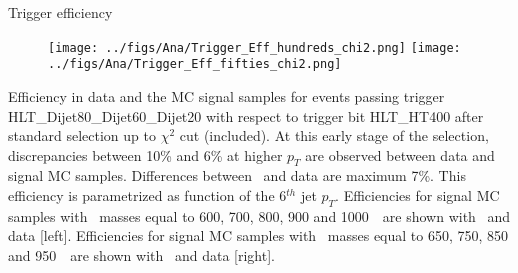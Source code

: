


\begin{frame}{Trigger efficiency}
\vspace{-.5cm}
\begin{figure}[!Hhtbp]
  \begin{center}
    \texttt{[image: ../figs/Ana/Trigger\_Eff\_hundreds\_chi2.png]}
    \texttt{[image: ../figs/Ana/Trigger\_Eff\_fifties\_chi2.png]}
  \end{center}
\end{figure}

\vspace{-.6cm}
    \begin{block}{}
      \tiny \centering Efficiency in data and the MC signal samples for events passing trigger HLT\_Dijet80\_Dijet60\_Dijet20 with respect to trigger bit HLT\_HT400 after standard selection up to $\chi^{2}$ cut (included). At this early stage of the selection, discrepancies between 10\% and 6\% at higher $p_{T}$ are observed between data and signal MC samples. Differences between \ttbar~and data are maximum 7\%. This efficiency is parametrized as function of the 6$^{th}$ jet $p_{T}$. Efficiencies for signal MC samples with \Tp~masses equal to 600, 700, 800, 900 and 1000~\GeVcc~are shown with \ttbar~and data [left]. Efficiencies for signal MC samples with \Tp~masses equal to 650, 750, 850 and 950~\GeVcc~are shown with \ttbar~and data [right].
    \end{block}

\end{frame}

